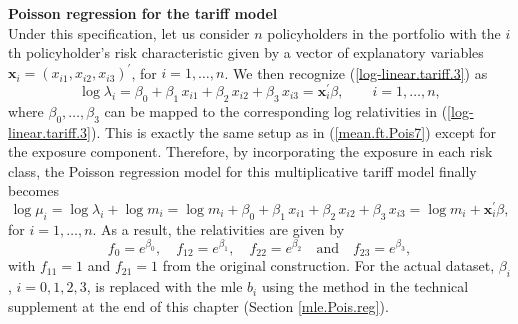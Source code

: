 \documentclass[12pt]{article}
\begin{document}
\noindent\textbf{Poisson regression for the tariff model}\\
Under this specification, let us consider $n$ policyholders in the portfolio with the $i$th policyholder's risk characteristic given by  a vector of explanatory variables $\mathbf{ x}_i=(x_{i1}, x_{i2},x_{i3})^{\prime}$, for $i=1, \ldots, n$. 
We then recognize  (\ref{log-linear.tariff.3}) as 
\begin{equation}
\label{log-linear.tariff.4}\nonumber
\log \lambda_{i}= \beta_0+ \beta_1 \, x_{i1} + \beta_{2} \, x_{i2} +\beta_3  \, x_{i3}=\mathbf{ x}^{\prime}_i\beta, \qquad i=1, \ldots, n,
\end{equation} where $\beta_0, \ldots, \beta_3$ can be mapped to the corresponding log relativities in (\ref{log-linear.tariff.3}). This  is exactly the same setup as in (\ref{mean.ft.Pois7}) except for the exposure component. Therefore, by incorporating the exposure in each risk class, the Poisson regression model for this multiplicative tariff model finally becomes 
\begin{equation}
\label{log-linear.tariff.6}\nonumber
\log \mu_i=\log \lambda_{i}+\log m_i= \log m_i+ \beta_0+ \beta_1 \, x_{i1} + \beta_{2} \, x_{i2} +\beta_3  \, x_{i3}=\log m_i+\mathbf{ x}^{\prime}_i\beta, 
\end{equation} for $i=1, \ldots, n$. 
As a result, the relativities are given by
\begin{equation}
\label{relativity.1}
{f}_0=e^{\beta_0}, \quad {f}_{12}=e^{\beta_1}, \quad {f}_{22}=e^{\beta_2} \quad \text{and}\quad {f}_{23}=e^{\beta_3},
\end{equation} with $f_{11}=1$ and $f_{21}=1$ from the original construction. For the actual dataset, $\beta_i$, $i=0,1, 2, 3$, is replaced with the mle  $b_i$ using the method in the technical supplement at the end of this chapter (Section \ref{mle.Pois.reg}). \\
%
%
\end{document}
